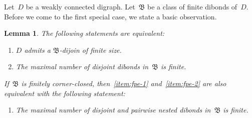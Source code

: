 \documentclass[reqno, 12pt]{amsart}
\numberwithin{equation}{section}
\numberwithin{figure}{section}
\theoremstyle{plain}
\newtheorem{lemma}[thm]{Lemma}
\theoremstyle{definition}
\begin{document}
Let~$D$ be a 
weakly connected 
digraph. 
Let~$\mathfrak{B}$ be a 
class of finite dibonds of~$D$.
Before we come to the first special case, we state a basic observation.

\begin{lemma}
    \label{lem:fin_parameter_equi}
    The following statements are equivalent:
    \begin{enumerate}[label=\textit{(\roman*)}]
        \item \label{item:fpe-1} 
            {$D$ admits a $\mathfrak{B}$-dijoin of finite size.}
        \item \label{item:fpe-2} 
            {The maximal number of disjoint dibonds in~$\mathfrak{B}$ is finite.}
    \end{enumerate}
    If~$\mathfrak{B}$ is finitely corner-closed, then~\ref{item:fpe-1} and~\ref{item:fpe-2} are also equivalent with the following statement:
    \begin{enumerate}[label=\textit{(\roman*)}, resume]
        \item \label{item:fpe-3} 
            {The maximal number of disjoint and pairwise nested dibonds in~$\mathfrak{B}$ is finite.}
    \end{enumerate}
\end{lemma}
\end{document}
